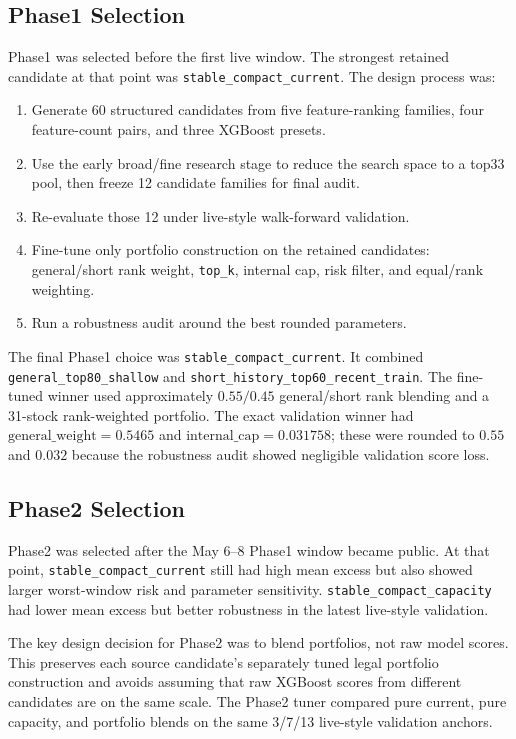 \documentclass[11pt]{article}
\begin{document}
\subsection{Phase1 Selection}

Phase1 was selected before the first live window. The strongest retained
candidate at that point was \texttt{stable\_compact\_current}. The design
process was:

\begin{enumerate}
  \item Generate 60 structured candidates from five feature-ranking families, four feature-count pairs, and three XGBoost presets.
  \item Use the early broad/fine research stage to reduce the search space to a top33 pool, then freeze 12 candidate families for final audit.
  \item Re-evaluate those 12 under live-style walk-forward validation.
  \item Fine-tune only portfolio construction on the retained candidates: general/short rank weight, \texttt{top\_k}, internal cap, risk filter, and equal/rank weighting.
  \item Run a robustness audit around the best rounded parameters.
\end{enumerate}

The final Phase1 choice was \texttt{stable\_compact\_current}. It combined
\texttt{general\_top80\_shallow} and
\texttt{short\_history\_top60\_recent\_train}. The fine-tuned winner used
approximately \(0.55/0.45\) general/short rank blending and a 31-stock
rank-weighted portfolio. The exact validation winner had
\(\text{general\_weight}=0.5465\) and \(\text{internal\_cap}=0.031758\); these
were rounded to \(0.55\) and \(0.032\) because the robustness audit showed
negligible validation score loss.

\subsection{Phase2 Selection}

Phase2 was selected after the May 6--8 Phase1 window became public. At that
point, \texttt{stable\_compact\_current} still had high mean excess but also
showed larger worst-window risk and parameter sensitivity.
\texttt{stable\_compact\_capacity} had lower mean excess but better robustness
in the latest live-style validation.

The key design decision for Phase2 was to blend portfolios, not raw model
scores. This preserves each source candidate's separately tuned legal
portfolio construction and avoids assuming that raw XGBoost scores from
different candidates are on the same scale. The Phase2 tuner compared pure
current, pure capacity, and portfolio blends on the same 3/7/13 live-style
validation anchors.
\end{document}
